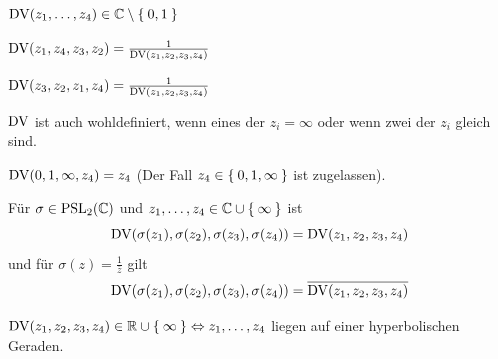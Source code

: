 \begin{bemerkung}
    \begin{bemenum}
        \item $\operatorname{DV}(z_1, \dots, z_4) \in \mathbb{C} \setminus \Set{0,1}$
        \item \label{bem:15.4b.ii} $\operatorname{DV}(z_1, z_4, z_3, z_2) = \frac{1}{\operatorname{DV}(z_1, z_2, z_3, z_4)}$
        \item $\operatorname{DV}(z_3, z_2, z_1, z_4) = \frac{1}{\operatorname{DV}(z_1, z_2, z_3, z_4)}$
        \item $\operatorname{DV}$ ist auch wohldefiniert, wenn eines der $z_i = \infty$
              oder wenn zwei der $z_i$ gleich sind.
        \item $\operatorname{DV}(0, 1, \infty, z_4) = z_4$ (Der Fall $z_4 \in \Set{0, 1, \infty}$ ist zugelassen).
        \item \label{bem:15.4d} Für $\sigma \in \mathrm{PSL}_2(\mathbb{C})$ und $z_1, \dots, z_4 \in \mathbb{C} \cup \Set{\infty}$
              ist 
              \[\operatorname{DV}(\sigma(z_1), \sigma(z_2), \sigma(z_3), \sigma(z_4)) = \operatorname{DV}(z_1, z_2, z_3, z_4)\]
              und für $\sigma(z) = \frac{1}{\overline{z}}$ gilt
              \[\operatorname{DV}(\sigma(z_1), \sigma(z_2), \sigma(z_3), \sigma(z_4)) = \overline{\operatorname{DV}(z_1, z_2, z_3, z_4)}\]
        \item \label{bem:15.4e} $\operatorname{DV}(z_1, z_2, z_3, z_4) \in \mathbb{R} \cup \Set{\infty} \Leftrightarrow z_1, \dots, z_4$
              liegen auf einer hyperbolischen Geraden.
    \end{bemenum}
\end{bemerkung}

